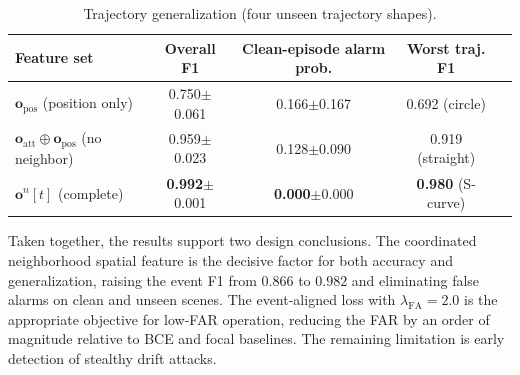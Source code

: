 \begin{table}[htbp]
  \centering
  \caption{Trajectory generalization (four unseen trajectory shapes).}
  \label{tab:trajectory}
  \begin{tabular}{lcccc}
    \toprule
    Feature set & Overall F1 & Clean-episode alarm prob. & Worst traj. F1 \\
    \midrule
    $\mathbf{o}_{\mathrm{pos}}$ (position only) & 0.750$\pm$0.061
      & 0.166$\pm$0.167 & 0.692 (circle) \\
    $\mathbf{o}_{\mathrm{att}}\oplus\mathbf{o}_{\mathrm{pos}}$ (no neighbor)
      & 0.959$\pm$0.023 & 0.128$\pm$0.090 & 0.919 (straight) \\
    $\mathbf{o}^n[t]$ (complete) & \textbf{0.992}$\pm$0.001
      & \textbf{0.000}$\pm$0.000 & \textbf{0.980} (S-curve) \\
    \bottomrule
  \end{tabular}
\end{table}

Taken together, the results support two design conclusions. The coordinated
neighborhood spatial feature is the decisive factor for both accuracy and
generalization, raising the event F1 from $0.866$ to $0.982$ and eliminating
false alarms on clean and unseen scenes. The event-aligned loss with
$\lambda_{\mathrm{FA}}{=}2.0$ is the appropriate objective for low-FAR
operation, reducing the FAR by an order of magnitude relative to BCE and
focal baselines. The remaining limitation is early detection of stealthy
drift attacks.

